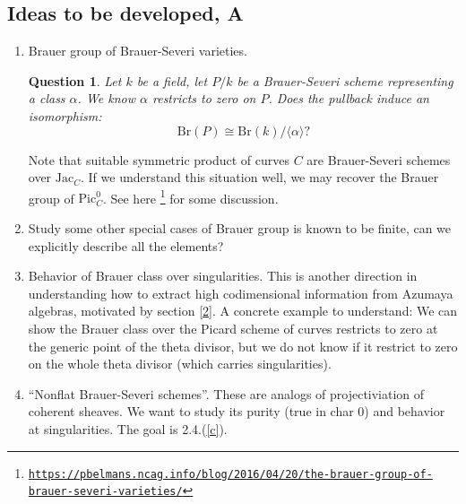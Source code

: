 \documentclass[8pt]{amsart}
\newtheorem{question}[theorem]{Question}
\begin{document}
\subsection{Ideas to be developed, A}
\begin{enumerate}

\item Brauer group of Brauer-Severi varieties. {\begin{question}\label{bsv}Let $k$ be a field, let $P/k$ be a Brauer-Severi scheme representing a class $\alpha$. We know $\alpha$ restricts to zero on $P$. Does the pullback induce an isomorphism: $$\mathrm{Br}(P)\cong\mathrm{Br}(k)/\langle\alpha\rangle?$$\end{question} Note that suitable symmetric product of curves $C$ are Brauer-Severi schemes over $\mathrm{Jac}_C$. If we understand this situation well, we may recover the Brauer group of $\mathrm{Pic}^0_C$. See here \footnote{\href{https://pbelmans.ncag.info/blog/2016/04/20/the-brauer-group-of-brauer-severi-varieties/}{\texttt{https://pbelmans.ncag.info/blog/2016/04/20/the-brauer-group-of-brauer-severi-varieties/}}} for some discussion.}
\item Study some other special cases of Brauer group is known to be finite, can we explicitly describe all the elements?
\item Behavior of Brauer class over singularities. This is another direction in understanding how to extract high codimensional information from Azumaya algebras, motivated by section \ref{2}. A concrete example to understand: We can show the Brauer class over the Picard scheme of curves restricts to zero at the generic point of the theta divisor, but we do not know if it restrict to zero on the whole theta divisor (which carries singularities).
\item ``Nonflat Brauer-Severi schemes''. These are analogs of projectiviation of coherent sheaves. We want to study its purity (true in char $0$) and behavior at singularities. The goal is 2.4.(\ref{c}).
\end{enumerate}
\end{document}

